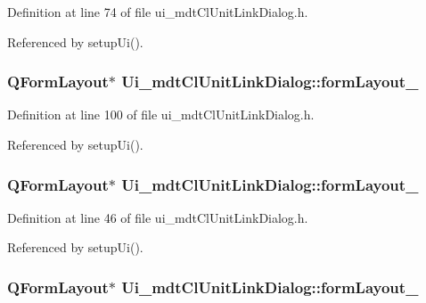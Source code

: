 Definition at line 74 of file ui\-\_\-mdt\-Cl\-Unit\-Link\-Dialog.\-h.



Referenced by setup\-Ui().

\hypertarget{class_ui__mdt_cl_unit_link_dialog_a5aab941e8762c827b8633931d145990c}{
\subsubsection[{form\-Layout\-\_\-2}]{\setlength{\rightskip}{0pt plus 5cm}Q\-Form\-Layout$\ast$ Ui\-\_\-mdt\-Cl\-Unit\-Link\-Dialog\-::form\-Layout\-\_}}\label{class_ui__mdt_cl_unit_link_dialog_a5aab941e8762c827b8633931d145990c}


Definition at line 100 of file ui\-\_\-mdt\-Cl\-Unit\-Link\-Dialog.\-h.



Referenced by setup\-Ui().

\hypertarget{class_ui__mdt_cl_unit_link_dialog_a8afca4823d551f46a7fc6b7216e2c77c}{
\subsubsection[{form\-Layout\-\_\-3}]{\setlength{\rightskip}{0pt plus 5cm}Q\-Form\-Layout$\ast$ Ui\-\_\-mdt\-Cl\-Unit\-Link\-Dialog\-::form\-Layout\-\_}}\label{class_ui__mdt_cl_unit_link_dialog_a8afca4823d551f46a7fc6b7216e2c77c}


Definition at line 46 of file ui\-\_\-mdt\-Cl\-Unit\-Link\-Dialog.\-h.



Referenced by setup\-Ui().

\hypertarget{class_ui__mdt_cl_unit_link_dialog_aaeb7395111f2a045b8271eb6124157c9}{
\subsubsection[{form\-Layout\-\_\-4}]{\setlength{\rightskip}{0pt plus 5cm}Q\-Form\-Layout$\ast$ Ui\-\_\-mdt\-Cl\-Unit\-Link\-Dialog\-::form\-Layout\-\_}}\label{class_ui__mdt_cl_unit_link_dialog_aaeb7395111f2a045b8271eb6124157c9}


